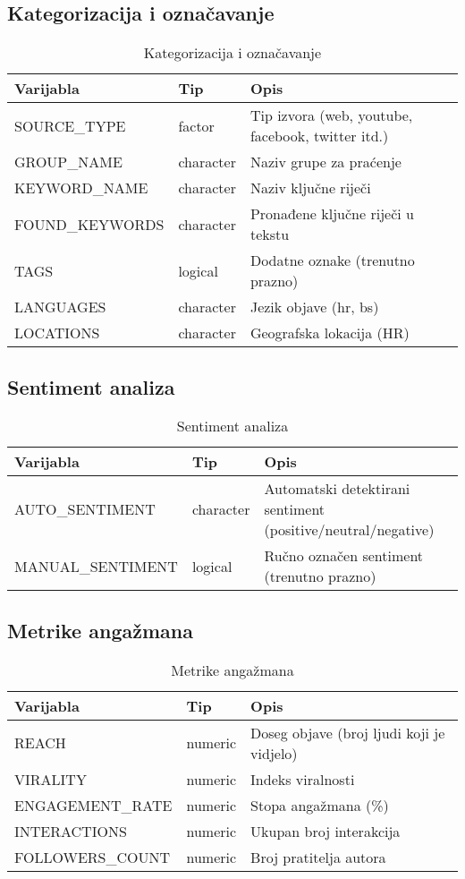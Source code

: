 \documentclass[
]{article}
\begin{document}
\subsection{Kategorizacija i
označavanje}\label{kategorizacija-i-oznaux10davanje}

\begin{longtable}[t]{lll}
\caption{\label{tab:categorization-vars}Kategorizacija i označavanje}\\
\toprule
Varijabla & Tip & Opis\\
\midrule
SOURCE\_TYPE & factor & Tip izvora (web, youtube, facebook, twitter itd.)\\
GROUP\_NAME & character & Naziv grupe za praćenje\\
KEYWORD\_NAME & character & Naziv ključne riječi\\
FOUND\_KEYWORDS & character & Pronađene ključne riječi u tekstu\\
TAGS & logical & Dodatne oznake (trenutno prazno)\\
\addlinespace
LANGUAGES & character & Jezik objave (hr, bs)\\
LOCATIONS & character & Geografska lokacija (HR)\\
\bottomrule
\end{longtable}

\subsection{Sentiment analiza}\label{sentiment-analiza}

\begin{longtable}[t]{lll}
\caption{\label{tab:sentiment-vars}Sentiment analiza}\\
\toprule
Varijabla & Tip & Opis\\
\midrule
AUTO\_SENTIMENT & character & Automatski detektirani sentiment (positive/neutral/negative)\\
MANUAL\_SENTIMENT & logical & Ručno označen sentiment (trenutno prazno)\\
\bottomrule
\end{longtable}

\subsection{Metrike angažmana}\label{metrike-angaux17emana}

\begin{longtable}[t]{lll}
\caption{\label{tab:engagement-vars}Metrike angažmana}\\
\toprule
Varijabla & Tip & Opis\\
\midrule
REACH & numeric & Doseg objave (broj ljudi koji je vidjelo)\\
VIRALITY & numeric & Indeks viralnosti\\
ENGAGEMENT\_RATE & numeric & Stopa angažmana (\%)\\
INTERACTIONS & numeric & Ukupan broj interakcija\\
FOLLOWERS\_COUNT & numeric & Broj pratitelja autora\\
\bottomrule
\end{longtable}
\end{document}
